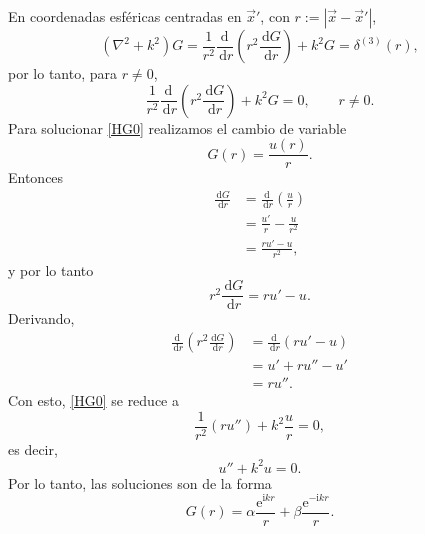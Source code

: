 \documentclass[11pt]{article}
\newcommand{\dd}{\,\mathrm{d}}
\newcommand{\ii}{\mathrm{i}}
\newcommand{\e}{\mathrm{e}}
\begin{document}
En coordenadas esféricas centradas en $\vec{x}'$, con $r:=|\vec{x}-\vec{x}'|$,
\begin{equation}\label{HGd}
(\nabla^2+k^2)G
=\frac{1}{r^2}\frac{\dd\ }{\dd r}\left(r^2\frac{\dd G}{\dd r}\right)+k^2G
=\delta^{(3)}(r),
\end{equation}
por lo tanto, para $r\neq0$,
\begin{equation}\label{HG0}
\frac{1}{r^2}\frac{\dd\ }{\dd r}\left(r^2\frac{\dd G}{\dd r}\right)+k^2G=0,\qquad r\neq0.
\end{equation}
Para solucionar \eqref{HG0} realizamos el cambio de variable
\begin{equation*}
G(r)=\frac{u(r)}{r}.
\end{equation*}
Entonces
\begin{align*}
\frac{\dd G}{\dd r}
&=\frac{\dd\ }{\dd r}\left(\frac{u}{r}\right)\\
&=\frac{u'}{r}-\frac{u}{r^2}\\
&=\frac{ru'-u}{r^2},
\end{align*}
y por lo tanto
\begin{equation*}
r^2\frac{\dd G}{\dd r}=ru'-u.
\end{equation*}
Derivando,
\begin{align*}
\frac{\dd\ }{\dd r}\left(r^2\frac{\dd G}{\dd r}\right)
&=\frac{\dd\ }{\dd r}(ru'-u)\\
&=u'+ru''-u'\\
&=ru''.
\end{align*}
Con esto, \eqref{HG0} se reduce a
\begin{equation*}
\frac{1}{r^2}(ru'')+k^2\frac{u}{r}=0,
\end{equation*}
es decir,
\begin{equation*}
u''+k^2u=0.
\end{equation*}
Por lo tanto, las soluciones son de la forma
\begin{equation}\label{GH3d}
G(r)=\alpha\frac{\e^{\ii kr}}{r}+\beta\frac{\e^{-\ii kr}}{r}.
\end{equation}
\end{document}
